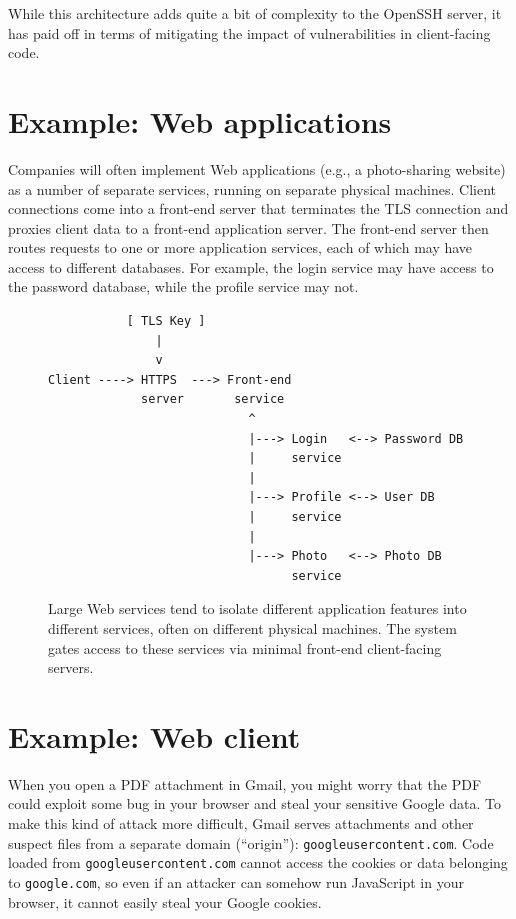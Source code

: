 While this architecture adds quite a bit of complexity to the OpenSSH
server, it has paid off in terms of mitigating the impact of vulnerabilities
in client-facing code.


\section{Example: Web applications}
Companies will often implement Web applications (e.g., a photo-sharing website)
as a number of separate services, running on separate physical machines.
Client connections come into a front-end server that terminates the TLS connection
and proxies client data to a front-end application server.
The front-end server then routes requests to one or more application
services, each of which may have access to different databases.
For example, the login service may have access to the password database,
while the profile service may not.

\begin{figure}
\begin{verbatim}
           [ TLS Key ]
               |                 
               v                  
Client ----> HTTPS  ---> Front-end 
             server       service
                            ^
                            |---> Login   <--> Password DB
                            |     service   
                            |
                            |---> Profile <--> User DB
                            |     service
                            |
                            |---> Photo   <--> Photo DB
                                  service
\end{verbatim}
\caption{Large Web services tend to isolate different application
  features into different services, often on different physical machines.
  The system gates access to these services via minimal front-end client-facing
  servers.}
\end{figure}

\section{Example: Web client}
\label{sec:webclient}
When you open a PDF attachment in Gmail, you might worry that the PDF
could exploit some bug in your browser and steal your sensitive Google
data.  To make this kind of attack more difficult, Gmail serves
attachments and other suspect files from a separate domain
(``origin''): \texttt{googleusercontent.com}.
Code loaded from \texttt{googleusercontent.com} cannot access the
cookies or data belonging to \texttt{google.com}, so even if an attacker
can somehow run JavaScript in your browser, it cannot easily steal your
Google cookies.

